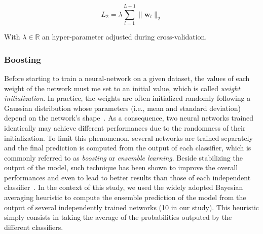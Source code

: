 \begin{equation}
L_{2} = \lambda \sum_{l=1}^{L+1} \|\textbf{w}_{l}\|_{2}
\end{equation}

With $\lambda \in \mathbb{R}$ an hyper-parameter adjusted during cross-validation.

\subsubsection{Boosting}
\label{boosting}
Before starting to train a neural-network on a given dataset, the values of each weight of the network must me set to an initial value, which is called \textit{weight initialization}. In practice, the weights are often initialized randomly following a Gaussian distribution whose parameters (i.e., mean and standard deviation) depend on the network's shape~\cite{glorot2010understanding}. As a consequence, two neural networks trained identically may achieve different performances due to the randomness of their initialization. To limit this phenomenon, several networks are trained separately and the final prediction is computed from the output of each classifier, which is commonly referred to as \textit{boosting} or \textit{ensemble learning}. Beside stabilizing the output of the model, such technique has been shown to improve the overall performances and even to lead to better results than those of each independent classifier~\cite{dietterich2000ensemble}. In the context of this study, we used the widely adopted Bayesian averaging heuristic to compute the ensemble prediction of the model from the output of several independently trained networks (10 in our study). This heuristic simply consists in taking the average of the probabilities outputed by the different classifiers. 